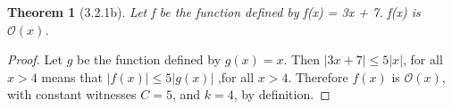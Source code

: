 \documentclass[a4paper, 12pt]{article}
\theoremstyle{plain}
\newtheorem*{theorem*}{Theorem}
\begin{document}
	
	\begin{theorem*}[3.2.1b]
		Let f be the function defined by f(x) = 3x + 7. \newline f(x) is $\mathcal{O} (x)$.
	\end{theorem*}
	
	\begin{proof}
		Let $g$ be the function defined by $g(x) = x$. Then $|3x + 7| \le 5|x|$, for all $x > 4$ means that $|f(x)| \le 5|g(x)|$ ,for all $x > 4$. Therefore $f(x)$ is $\mathcal{O}(x)$, with constant witnesses $C = 5$, and $k = 4$, by definition.
	\end{proof}
\end{document}

